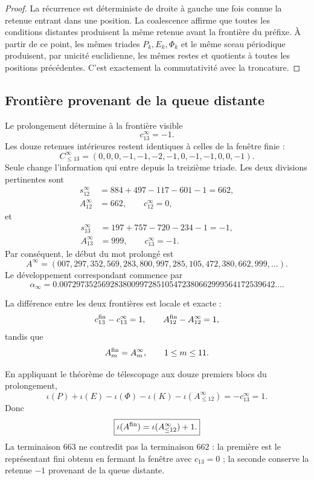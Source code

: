 \begin{proof}
La récurrence est déterministe de droite à gauche une fois connue la
retenue entrant dans une position. La coalescence affirme que toutes les
conditions distantes produisent la même retenue avant la frontière du
préfixe. À partir de ce point, les mêmes triades \(P_k,E_k,\Phi_k\) et le même
sceau périodique produisent, par unicité euclidienne, les mêmes restes et
quotients à toutes les positions précédentes. C’est exactement la
commutativité avec la troncature.
\end{proof}

\subsection{Frontière provenant de la queue distante}

Le prolongement détermine à la frontière visible
\[
 c_{13}^{\infty}=-1.
\]
Les douze retenues intérieures restent identiques à celles de la fenêtre
finie :
\[
 \boxed{
 C_{\leq13}^{\infty}
 =(0,0,0,-1,-1,-2,-1,0,-1,-1,0,0,-1).}
\]
Seule change l’information qui entre depuis la treizième triade. Les
deux divisions pertinentes sont
\[
\begin{aligned}
 s_{12}^{\infty}
 &=884+497-117-601-1=662,\\
 A_{12}^{\infty}&=662,
 \qquad c_{12}^{\infty}=0,
\end{aligned}
\]
et
\[
\begin{aligned}
 s_{13}^{\infty}
 &=197+757-720-234-1=-1,\\
 A_{13}^{\infty}&=999,
 \qquad c_{13}^{\infty}=-1.
\end{aligned}
\]
Par conséquent, le début du mot prolongé est
\[
 \boxed{
 A^{\infty}
 =(007,297,352,569,283,800,997,285,105,472,380,662,999,\ldots).}
\]
Le développement correspondant commence par
\begin{equation}
 \boxed{
 \alpha_{\infty}
 =0.007297352569283800997285105472380662999564172539642\ldots.}
 \label{p12-83-c10-s2:eq:alpha-infinita-autonoma}
\end{equation}

La différence entre les deux frontières est locale et exacte :
\[
 c_{13}^{\rm fin}-c_{13}^{\infty}=1,
 \qquad
 A_{12}^{\rm fin}-A_{12}^{\infty}=1,
\]
tandis que
\[
 A_m^{\rm fin}=A_m^\infty,
 \qquad 1\leq m\leq11.
\]

En appliquant le théorème de télescopage aux douze premiers blocs du
prolongement,
\[
 \iota(P)+\iota(E)-\iota(\Phi)-\iota(K)
 -\iota(A^\infty_{\leq12})
 =-c_{13}^{\infty}=1.
\]
Donc
\begin{equation}
 \boxed{
 \iota(A^{\rm fin})
 =\iota(A^\infty_{\leq12})+1.}
 \label{p12-83-c10-s2:eq:relacion-unidad-fronteras-alpha}
\end{equation}
La terminaison \(663\) ne contredit pas la terminaison \(662\) : la première
est le représentant fini obtenu en fermant la fenêtre avec
\(c_{13}=0\) ; la seconde conserve la retenue \(-1\) provenant de la queue
distante.

